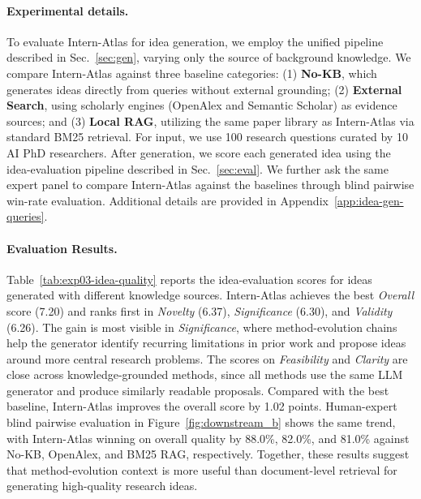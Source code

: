 \documentclass{opendatalab}
\begin{document}
\paragraph{Experimental details.}
To evaluate Intern-Atlas for idea generation, we employ the unified pipeline described in Sec.~\ref{sec:gen}, varying only the source of background knowledge. We compare Intern-Atlas against three baseline categories: (1) \textbf{No-KB}, which generates ideas directly from queries without external grounding; (2) \textbf{External Search}, using scholarly engines (OpenAlex and Semantic Scholar) as evidence sources; and (3) \textbf{Local RAG}, utilizing the same paper library as Intern-Atlas via standard BM25 retrieval. For input, we use 100 research questions curated by 10 AI PhD researchers. After generation, we score each generated idea using the idea-evaluation pipeline described in Sec.~\ref{sec:eval}. We further ask the same expert panel to compare Intern-Atlas against the baselines through blind pairwise win-rate evaluation. Additional details are provided in Appendix~\ref{app:idea-gen-queries}.

\paragraph{Evaluation Results.}
Table~\ref{tab:exp03-idea-quality} reports the idea-evaluation scores for ideas generated with different knowledge sources. Intern-Atlas achieves the best \textit{Overall} score (7.20) and ranks first in \textit{Novelty} (6.37), \textit{Significance} (6.30), and \textit{Validity} (6.26). The gain is most visible in \textit{Significance}, where method-evolution chains help the generator identify recurring limitations in prior work and propose ideas around more central research problems. The scores on \textit{Feasibility} and \textit{Clarity} are close across knowledge-grounded methods, since all methods use the same LLM generator and produce similarly readable proposals. Compared with the best baseline, Intern-Atlas improves the overall score by 1.02 points. Human-expert blind pairwise evaluation in Figure~\ref{fig:downstream_b} shows the same trend, with Intern-Atlas winning on overall quality by 88.0\%, 82.0\%, and 81.0\% against No-KB, OpenAlex, and BM25 RAG, respectively. Together, these results suggest that method-evolution context is more useful than document-level retrieval for generating high-quality research ideas.
\end{document}
